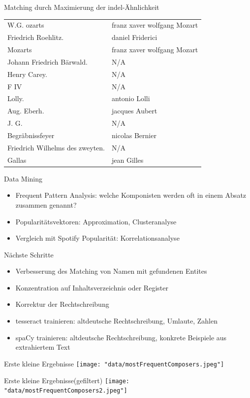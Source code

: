 \documentclass[aspectratio=169]{beamer}
\begin{document}
\begin{frame}{Matching durch Maximierung der indel-Ähnlichkeit}
	\fontsize{9pt}{10pt}\selectfont
	\begin{tabular}{l|l}
		W.G. ozarts & franz xaver wolfgang Mozart\\
		Friedrich Roehlitz. & daniel Friderici\\
		Mozarts & franz xaver wolfgang Mozart\\
		Johann Friedrich Bärwald. & N/A \\
		Henry Carey. & N/A \\
		F IV & N/A \\
		Lolly. & antonio Lolli\\
		Aug. Eberh. & jacques Aubert\\
		J. G. & N/A \\
		Begräbnissfeyer & nicolas Bernier\\
		Friedrich Wilhelms des zweyten. & N/A \\
		Gallas & jean Gilles\\
	\end{tabular}
\end{frame}
\begin{frame}{Data Mining}
	\begin{itemize}
		\item Frequent Pattern Analysis: welche Komponisten werden oft in einem Absatz zusammen genannt?
		\item Popularitätsvektoren: Approximation, Clusteranalyse
		\item Vergleich mit Spotify Popularität: Korrelationsanalyse
	\end{itemize}
\end{frame}
\begin{frame}{Nächste Schritte}
	\begin{itemize}
		\item Verbesserung des Matching von Namen mit gefundenen Entites
		\item Konzentration auf Inhaltsverzeichnis oder Register
		\item Korrektur der Rechtschreibung
		\item tesseract trainieren: altdeutsche Rechtschreibung, Umlaute, Zahlen
		\item spaCy trainieren: altdeutsche Rechtschreibung, konkrete Beispiele aus extrahiertem Text
	\end{itemize}
\end{frame}
\begin{frame}{Erste kleine Ergebnisse}
	\texttt{[image: "data/mostFrequentComposers.jpeg"]}
\end{frame}
\begin{frame}{Erste kleine Ergebnisse(gefiltert)}
	\texttt{[image: "data/mostFrequentComposers2.jpeg"]}
\end{frame}
\end{document}
